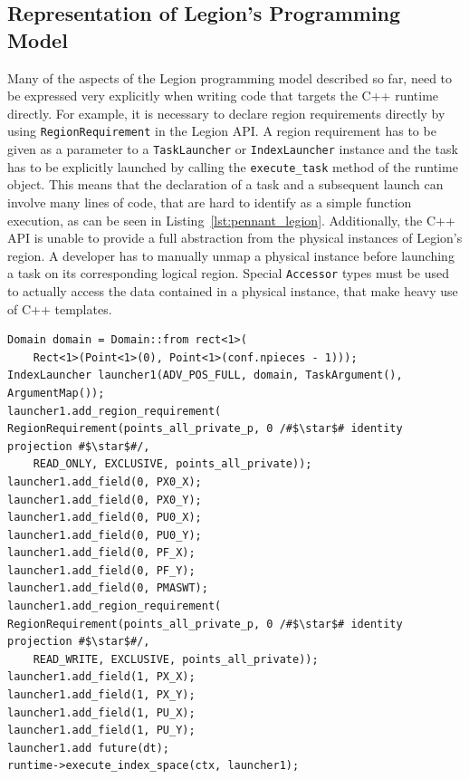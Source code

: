 \documentclass{article}      %
\begin{document}
\subsection{Representation of Legion's Programming Model}
Many of the aspects of the Legion programming model described so far, need to be expressed very explicitly when writing code that targets the C++ runtime directly.
For example, it is necessary to declare region requirements directly by using \lstinline{RegionRequirement} in the Legion API.
A region requirement has to be given as a parameter to a \lstinline{TaskLauncher} or \lstinline{IndexLauncher} instance and the task has to be explicitly launched by calling the \lstinline{execute_task} method of the runtime object.
This means that the declaration of a task and a subsequent launch can involve many lines of code, that are hard to identify as a simple function execution, as can be seen in Listing~\ref{lst:pennant_legion}. Additionally, the C++ API is unable to provide a full abstraction from the physical instances of Legion's region.
A developer has to manually unmap a physical instance before launching a task on its corresponding logical region. Special \lstinline{Accessor} types must be used to actually access the data contained in a physical instance, that make heavy use of C++ templates.


\begin{lstlisting}[frame=single,label={lst:pennant_legion},
		caption={Excerpt from PENNANT~\cite{ferenbaugh2015pennant} main simulation loop in Legion C++ API as presented in~\cite{SlaughterThesis}.}]
Domain domain = Domain::from rect<1>(
	Rect<1>(Point<1>(0), Point<1>(conf.npieces - 1)));
IndexLauncher launcher1(ADV_POS_FULL, domain, TaskArgument(), ArgumentMap());
launcher1.add_region_requirement(
RegionRequirement(points_all_private_p, 0 /#$\star$# identity projection #$\star$#/, 
	READ_ONLY, EXCLUSIVE, points_all_private));
launcher1.add_field(0, PX0_X);
launcher1.add_field(0, PX0_Y);
launcher1.add_field(0, PU0_X);
launcher1.add_field(0, PU0_Y);
launcher1.add_field(0, PF_X);
launcher1.add_field(0, PF_Y);
launcher1.add_field(0, PMASWT);
launcher1.add_region_requirement(
RegionRequirement(points_all_private_p, 0 /#$\star$# identity projection #$\star$#/, 
	READ_WRITE, EXCLUSIVE, points_all_private));
launcher1.add_field(1, PX_X);
launcher1.add_field(1, PX_Y);
launcher1.add_field(1, PU_X);
launcher1.add_field(1, PU_Y);
launcher1.add future(dt);
runtime->execute_index_space(ctx, launcher1);
\end{lstlisting}
\end{document}
